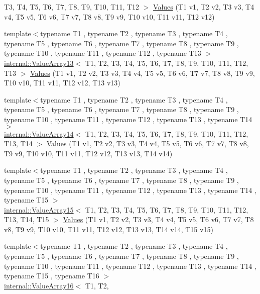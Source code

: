 \begin{DoxyCompactItemize}
\-T3, \-T4, \-T5, \-T6, \-T7, \-T8, \-T9, \*
\-T10, \-T11, \-T12 $>$ \hyperlink{namespacetesting_a03e7f9611794732bb030c53365dc6c86}{\-Values} (\-T1 v1, \-T2 v2, \-T3 v3, \-T4 v4, \-T5 v5, \-T6 v6, \-T7 v7, \-T8 v8, \-T9 v9, \-T10 v10, \-T11 v11, \-T12 v12)
\item 
{\footnotesize template$<$typename T1 , typename T2 , typename T3 , typename T4 , typename T5 , typename T6 , typename T7 , typename T8 , typename T9 , typename T10 , typename T11 , typename T12 , typename T13 $>$ }\\\hyperlink{classtesting_1_1internal_1_1ValueArray13}{internal\-::\-Value\-Array13}$<$ \-T1, \-T2, \*
\-T3, \-T4, \-T5, \-T6, \-T7, \-T8, \-T9, \*
\-T10, \-T11, \-T12, \-T13 $>$ \hyperlink{namespacetesting_aa13a09e043383c947042ba726d25d47c}{\-Values} (\-T1 v1, \-T2 v2, \-T3 v3, \-T4 v4, \-T5 v5, \-T6 v6, \-T7 v7, \-T8 v8, \-T9 v9, \-T10 v10, \-T11 v11, \-T12 v12, \-T13 v13)
\item 
{\footnotesize template$<$typename T1 , typename T2 , typename T3 , typename T4 , typename T5 , typename T6 , typename T7 , typename T8 , typename T9 , typename T10 , typename T11 , typename T12 , typename T13 , typename T14 $>$ }\\\hyperlink{classtesting_1_1internal_1_1ValueArray14}{internal\-::\-Value\-Array14}$<$ \-T1, \-T2, \*
\-T3, \-T4, \-T5, \-T6, \-T7, \-T8, \-T9, \*
\-T10, \-T11, \-T12, \-T13, \-T14 $>$ \hyperlink{namespacetesting_a2d00ed785e0e796e6f36dc79c051dc76}{\-Values} (\-T1 v1, \-T2 v2, \-T3 v3, \-T4 v4, \-T5 v5, \-T6 v6, \-T7 v7, \-T8 v8, \-T9 v9, \-T10 v10, \-T11 v11, \-T12 v12, \-T13 v13, \-T14 v14)
\item 
{\footnotesize template$<$typename T1 , typename T2 , typename T3 , typename T4 , typename T5 , typename T6 , typename T7 , typename T8 , typename T9 , typename T10 , typename T11 , typename T12 , typename T13 , typename T14 , typename T15 $>$ }\\\hyperlink{classtesting_1_1internal_1_1ValueArray15}{internal\-::\-Value\-Array15}$<$ \-T1, \-T2, \*
\-T3, \-T4, \-T5, \-T6, \-T7, \-T8, \-T9, \*
\-T10, \-T11, \-T12, \-T13, \-T14, \-T15 $>$ \hyperlink{namespacetesting_ab0c1943e4f680df0d92c695ed0ac36df}{\-Values} (\-T1 v1, \-T2 v2, \-T3 v3, \-T4 v4, \-T5 v5, \-T6 v6, \-T7 v7, \-T8 v8, \-T9 v9, \-T10 v10, \-T11 v11, \-T12 v12, \-T13 v13, \-T14 v14, \-T15 v15)
\item 
{\footnotesize template$<$typename T1 , typename T2 , typename T3 , typename T4 , typename T5 , typename T6 , typename T7 , typename T8 , typename T9 , typename T10 , typename T11 , typename T12 , typename T13 , typename T14 , typename T15 , typename T16 $>$ }\\\hyperlink{classtesting_1_1internal_1_1ValueArray16}{internal\-::\-Value\-Array16}$<$ \-T1, \-T2, \*

\end{DoxyCompactItemize}
